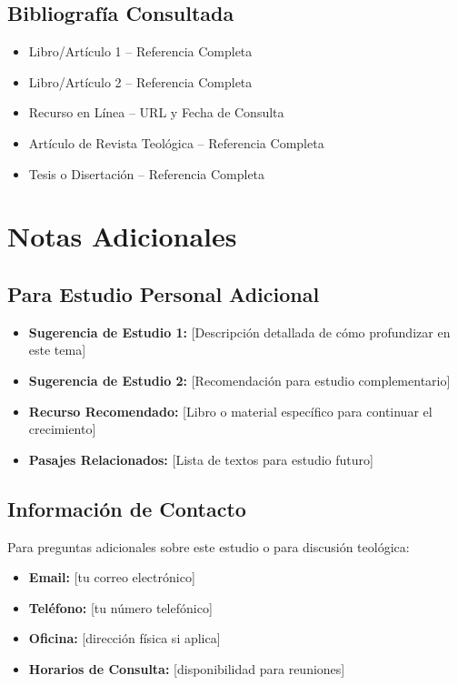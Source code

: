 \documentclass[12pt,a4paper]{article}
\begin{document}
\subsection{Bibliografía Consultada}

\begin{itemize}[leftmargin=1.5em]
    \item Libro/Artículo 1 -- Referencia Completa
    \item Libro/Artículo 2 -- Referencia Completa
    \item Recurso en Línea -- URL y Fecha de Consulta
    \item Artículo de Revista Teológica -- Referencia Completa
    \item Tesis o Disertación -- Referencia Completa
\end{itemize}

\section{Notas Adicionales}

\subsection{Para Estudio Personal Adicional}

\begin{itemize}[leftmargin=*]
    \item \textbf{Sugerencia de Estudio 1:} [Descripción detallada de cómo profundizar en este tema]
    \item \textbf{Sugerencia de Estudio 2:} [Recomendación para estudio complementario]
    \item \textbf{Recurso Recomendado:} [Libro o material específico para continuar el crecimiento]
    \item \textbf{Pasajes Relacionados:} [Lista de textos para estudio futuro]
\end{itemize}

\subsection{Información de Contacto}

Para preguntas adicionales sobre este estudio o para discusión teológica:

\begin{itemize}[leftmargin=*]
    \item \textbf{Email:} [tu correo electrónico]
    \item \textbf{Teléfono:} [tu número telefónico]
    \item \textbf{Oficina:} [dirección física si aplica]
    \item \textbf{Horarios de Consulta:} [disponibilidad para reuniones]
\end{itemize}
\end{document}
